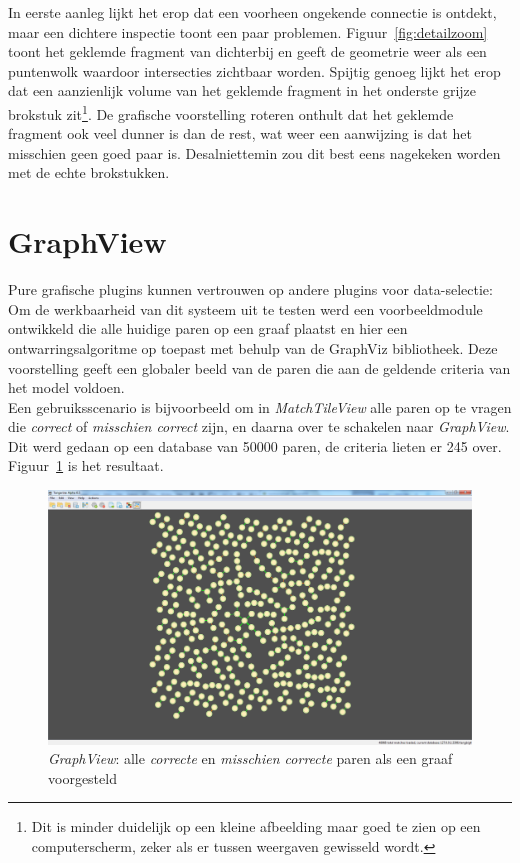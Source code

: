 In eerste aanleg lijkt het erop dat een voorheen ongekende connectie is ontdekt, maar een dichtere inspectie toont een paar problemen. Figuur~\ref{fig:detailzoom} toont het geklemde fragment van dichterbij en geeft de geometrie weer als een puntenwolk waardoor intersecties zichtbaar worden. Spijtig genoeg lijkt het erop dat een aanzienlijk volume van het geklemde fragment in het onderste grijze brokstuk zit\footnote{Dit is minder duidelijk op een kleine afbeelding maar goed te zien op een computerscherm, zeker als er tussen weergaven gewisseld wordt.}. De grafische voorstelling roteren onthult dat het geklemde fragment ook veel dunner is dan de rest, wat weer een aanwijzing is dat het misschien geen goed paar is. Desalniettemin zou dit best eens nagekeken worden met de echte brokstukken.

\section{GraphView}
Pure grafische plugins kunnen vertrouwen op andere plugins voor data-selectie: Om de werkbaarheid van dit systeem uit te testen werd een voorbeeldmodule ontwikkeld die alle huidige paren op een graaf plaatst en hier een ontwarringsalgoritme op toepast met behulp van de GraphViz bibliotheek. Deze voorstelling geeft een globaler beeld van de paren die aan de geldende criteria van het model voldoen.\\

Een gebruiksscenario is bijvoorbeeld om in \emph{MatchTileView} alle paren op te vragen die \emph{correct} of \emph{misschien correct} zijn, en daarna over te schakelen naar \emph{GraphView}. Dit werd gedaan op een database van 50000 paren, de criteria lieten er 245 over. Figuur~\ref{fig:graphyesmaybe} is het resultaat.\\

\begin{figure}[ht]
	\begin{center}
		\includegraphics[width=1.0\columnwidth]{images/nodeview-yesmaybe.png}
		\caption{\emph{GraphView}: alle \emph{correcte} en \emph{misschien correcte} paren als een graaf voorgesteld}
		\label{fig:graphyesmaybe}
	\end{center}
\end{figure}

